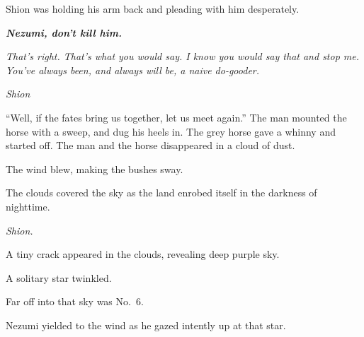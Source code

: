 Shion was holding his arm back and pleading with him desperately.

\emph{\textbf{Nezumi, don't kill him.}}

\emph{That's right. That's what you would say. I know you would say that and
stop me. You've always been, and always will be, a naive do-gooder.}

\emph{Shion\el }

``Well, if the fates bring us together, let us meet again.'' The man
mounted the horse with a sweep, and dug his heels in. The grey horse
gave a whinny and started off. The man and the horse disappeared in a
cloud of dust.

The wind blew, making the bushes sway.

The clouds covered the sky as the land enrobed itself in the
darkness of nighttime.

\emph{Shion.}

A tiny crack appeared in the clouds, revealing deep purple sky.

A solitary star twinkled.

Far off into that sky was No.~6.

Nezumi yielded to the wind as he gazed intently up at that star.